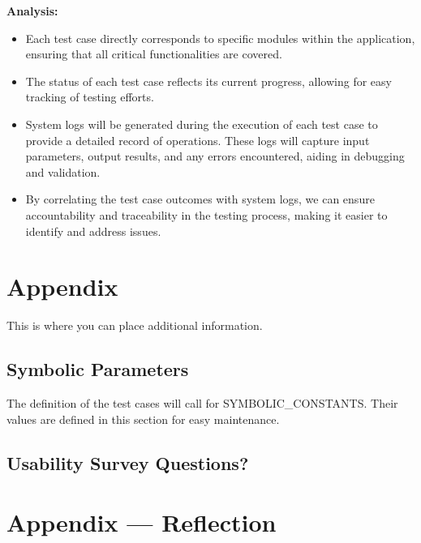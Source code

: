 \documentclass[12pt, titlepage]{article}
\begin{document}
\textbf{Analysis:}
\begin{itemize}
    \item Each test case directly corresponds to specific modules within the application, ensuring that all critical functionalities are covered.
    \item The status of each test case reflects its current progress, allowing for easy tracking of testing efforts.
    \item System logs will be generated during the execution of each test case to provide a detailed record of operations. These logs will capture input parameters, output results, and any errors encountered, aiding in debugging and validation.
    \item By correlating the test case outcomes with system logs, we can ensure accountability and traceability in the testing process, making it easier to identify and address issues.
\end{itemize}
				




\newpage

\section{Appendix}

This is where you can place additional information.

\subsection{Symbolic Parameters}

The definition of the test cases will call for SYMBOLIC\_CONSTANTS.
Their values are defined in this section for easy maintenance.

\subsection{Usability Survey Questions?}


\newpage{}
\section*{Appendix --- Reflection}

\end{document}
